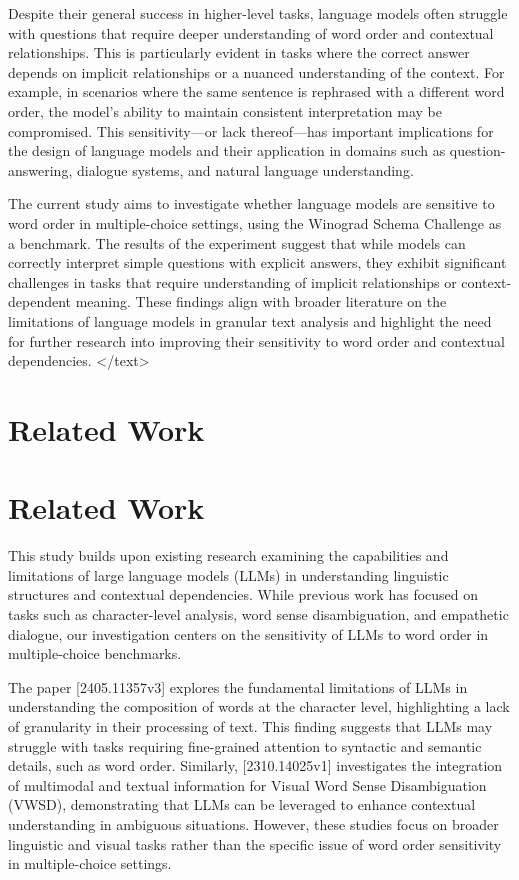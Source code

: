\documentclass{article}
\begin{document}
Despite their general success in higher-level tasks, language models often struggle with questions that require deeper understanding of word order and contextual relationships. This is particularly evident in tasks where the correct answer depends on implicit relationships or a nuanced understanding of the context. For example, in scenarios where the same sentence is rephrased with a different word order, the model's ability to maintain consistent interpretation may be compromised. This sensitivity—or lack thereof—has important implications for the design of language models and their application in domains such as question-answering, dialogue systems, and natural language understanding.

The current study aims to investigate whether language models are sensitive to word order in multiple-choice settings, using the Winograd Schema Challenge as a benchmark. The results of the experiment suggest that while models can correctly interpret simple questions with explicit answers, they exhibit significant challenges in tasks that require understanding of implicit relationships or context-dependent meaning. These findings align with broader literature on the limitations of language models in granular text analysis and highlight the need for further research into improving their sensitivity to word order and contextual dependencies.
</text>
\section{Related Work}
\section*{Related Work}

This study builds upon existing research examining the capabilities and limitations of large language models (LLMs) in understanding linguistic structures and contextual dependencies. While previous work has focused on tasks such as character-level analysis, word sense disambiguation, and empathetic dialogue, our investigation centers on the sensitivity of LLMs to word order in multiple-choice benchmarks. 

The paper [2405.11357v3] explores the fundamental limitations of LLMs in understanding the composition of words at the character level, highlighting a lack of granularity in their processing of text. This finding suggests that LLMs may struggle with tasks requiring fine-grained attention to syntactic and semantic details, such as word order. Similarly, [2310.14025v1] investigates the integration of multimodal and textual information for Visual Word Sense Disambiguation (VWSD), demonstrating that LLMs can be leveraged to enhance contextual understanding in ambiguous situations. However, these studies focus on broader linguistic and visual tasks rather than the specific issue of word order sensitivity in multiple-choice settings.
\end{document}
